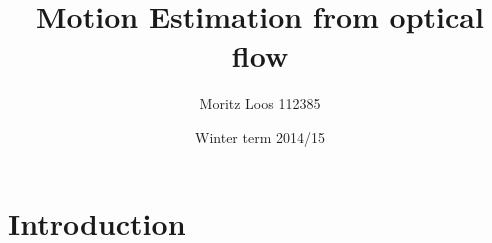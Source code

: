 \documentclass[11pt]{article}
\title{\textbf{Motion Estimation from optical flow}}
\author{ Moritz Loos 112385 }
\date{ Winter term 2014/15 }
\begin{document}
	
	\maketitle


	\section{Introduction}

	
	
	
\end{document}
